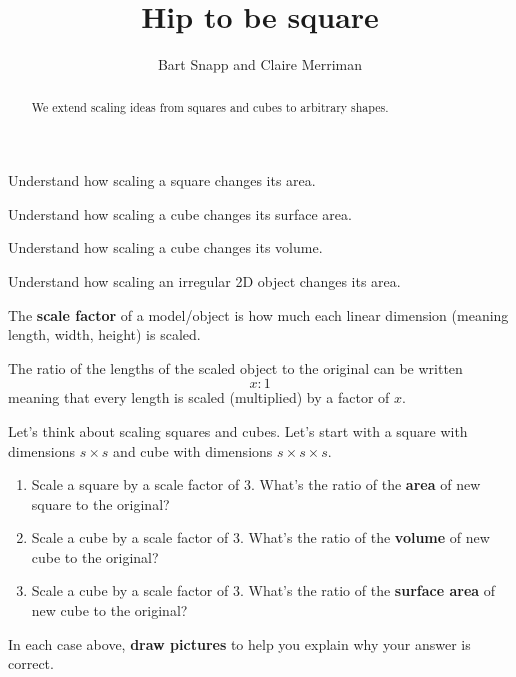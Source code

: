 \documentclass[handout,nooutcomes,noauthor,hints,12pt]{ximera}
\title{Hip to be square}
\author{Bart Snapp and Claire Merriman}
\begin{document}
\begin{abstract}
  We extend scaling ideas from squares and cubes to arbitrary shapes.
\end{abstract}
\maketitle

\begin{listOutcomes}
\item Understand how scaling a square changes its area.
\item Understand how scaling a cube changes its surface area.
\item Understand how scaling a cube changes its volume.
\item Understand how scaling an irregular 2D object changes its area.
\end{listOutcomes}



\begin{definition}
 The \textbf{scale factor} of a model/object is how much each linear
 dimension (meaning length, width, height) is scaled.


 The ratio of the lengths of the scaled object to the original can be written
 \[
x:1
 \]
 meaning that every length is scaled (multiplied) by a factor of $x$.
\end{definition}

\mynewpage

\begin{question}
  Let's think about scaling squares and cubes. Let's start with a
  square with dimensions $s\times s$ and cube with dimensions $s\times
  s\times s$.
  \begin{enumerate}
  \item Scale a square by a scale factor of $3$. What's the ratio of the \textbf{area} of new square to the original?
  \item Scale a cube by a scale factor of $3$. What's the ratio of the \textbf{volume} of new cube to the original?
  \item Scale a cube by a scale factor of $3$. What's the ratio of the \textbf{surface area} of new cube to the original?
  \end{enumerate}
  In each case above, \textbf{draw pictures} to help you explain why
  your answer is correct.
\end{question}
\mynewpage
\end{document}
